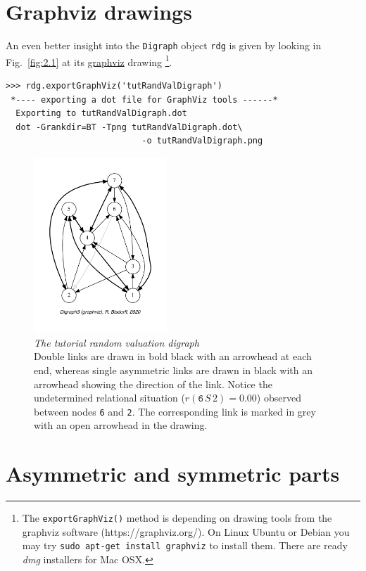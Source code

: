 \section{Graphviz drawings}
\label{sec:2.2}

An even better insight into the \texttt{Digraph} object \texttt{rdg} is given by looking in Fig.~\vref{fig:2.1} at its \href{https://graphviz.org/}{graphviz} drawing \citep{graphviz}\footnote{The \texttt{exportGraphViz()} method is depending on drawing tools from the graphviz software (https://graphviz.org/). On Linux Ubuntu or Debian you may try \texttt{sudo apt-get install graphviz} to install them. There are ready \emph{dmg} installers for Mac OSX.}.
\begin{lstlisting}
>>> rdg.exportGraphViz('tutRandValDigraph')
 *---- exporting a dot file for GraphViz tools ------*
  Exporting to tutRandValDigraph.dot
  dot -Grankdir=BT -Tpng tutRandValDigraph.dot\
                           -o tutRandValDigraph.png
\end{lstlisting}
\begin{figure}[ht]
\sidecaption[t]
\includegraphics[width=5cm]{Figures/2-1-tutRandValDigraph.pdf}
\caption[The tutorial random valuation digraph]{\emph{The tutorial random valuation digraph}\\ Double links are drawn in bold black with an arrowhead at each end, whereas single asymmetric links are drawn in black with an arrowhead showing the direction of the link. Notice the undetermined relational situation ($r(\mathtt{6}\,S\,\mathtt{}2) = 0.00$) observed between nodes \texttt{6} and \texttt{2}. The corresponding link is marked in grey with an open arrowhead in the drawing.}
\label{fig:2.1}       %
\end{figure}
  
\section{Asymmetric and symmetric parts}
\label{sec:2.3}

